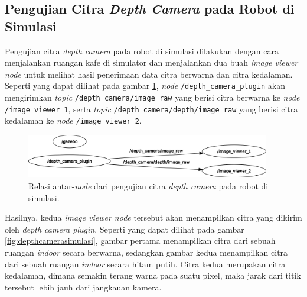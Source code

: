\subsection{Pengujian Citra \emph{Depth Camera} pada Robot di Simulasi}
\label{subsec:citradepthsimulasi}

Pengujian citra \emph{depth camera} pada robot di simulasi dilakukan dengan cara menjalankan ruangan kafe di simulator dan menjalankan dua buah \emph{image viewer node} untuk melihat hasil penerimaan data citra berwarna dan citra kedalaman.
Seperti yang dapat dilihat pada gambar \ref{fig:rosgraphdepthcameraplugin},
  \emph{node} \lstinline{/depth_camera_plugin} akan mengirimkan \emph{topic} \lstinline{/depth_camera/image_raw} yang berisi citra berwarna ke \emph{node} \lstinline{/image_viewer_1},
  serta \emph{topic} \lstinline{/depth_camera/depth/image_raw} yang berisi citra kedalaman ke \emph{node} \lstinline{/image_viewer_2}.

\begin{figure}[ht]
  \centering
  \includegraphics[width=0.95\textwidth,keepaspectratio]{gambar/rosgraph-depth-camera-plugin.png}
  \caption{Relasi antar-\emph{node} dari pengujian citra \emph{depth camera} pada robot di simulasi.}
  \label{fig:rosgraphdepthcameraplugin}
\end{figure}

Hasilnya, kedua \emph{image viewer node} tersebut akan menampilkan citra yang dikirim oleh \emph{depth camera plugin}.
Seperti yang dapat dilihat pada gambar \ref{fig:depthcamerasimulasi},
  gambar pertama menampilkan citra dari sebuah ruangan \emph{indoor} secara berwarna,
  sedangkan gambar kedua menampilkan citra dari sebuah ruangan \emph{indoor} secara hitam putih.
Citra kedua merupakan citra kedalaman, dimana semakin terang warna pada suatu pixel,
  maka jarak dari titik tersebut lebih jauh dari jangkauan kamera.

